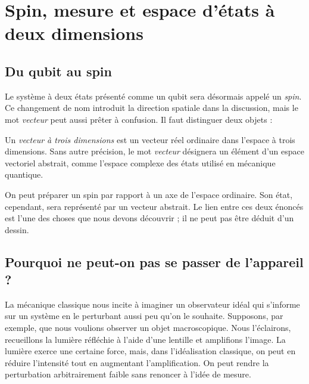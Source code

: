 \chapter{Spin, mesure et espace d’états à deux dimensions}


\section{Du qubit au spin}

Le système à deux états présenté comme un qubit sera désormais appelé un \emph{spin}. Ce changement de nom introduit la direction spatiale dans la discussion, mais le mot \emph{vecteur} peut aussi prêter à confusion. Il faut distinguer deux objets :

\begin{definition}
Un \emph{vecteur à trois dimensions} est un vecteur réel ordinaire dans l’espace à trois dimensions. Sans autre précision, le mot \emph{vecteur} désignera un élément d’un espace vectoriel abstrait, comme l’espace complexe des états utilisé en mécanique quantique.
\end{definition}

On peut préparer un spin par rapport à un axe de l’espace ordinaire. Son état, cependant, sera représenté par un vecteur abstrait. Le lien entre ces deux énoncés est l’une des choses que nous devons découvrir ; il ne peut pas être déduit d’un dessin.

\section{Pourquoi ne peut-on pas se passer de l’appareil ?}

La mécanique classique nous incite à imaginer un observateur idéal qui s’informe sur un système en le perturbant aussi peu qu’on le souhaite. Supposons, par exemple, que nous voulions observer un objet macroscopique. Nous l’éclairons, recueillons la lumière réfléchie à l’aide d’une lentille et amplifions l’image. La lumière exerce une certaine force, mais, dans l’idéalisation classique, on peut en réduire l’intensité tout en augmentant l’amplification. On peut rendre la perturbation arbitrairement faible sans renoncer à l’idée de mesure.

